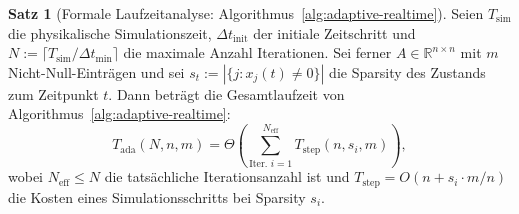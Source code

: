 \documentclass[a4paper,12pt]{report}
\theoremstyle{definition}
\newtheorem{satz}{Satz}
\begin{document}
	\begin{satz}[Formale Laufzeitanalyse: Algorithmus~\ref{alg:adaptive-realtime}]
		\label{satz:laufzeit-adaptive-realtime}
		Seien $T_{\mathrm{sim}}$ die physikalische Simulationszeit, $\Delta t_{\mathrm{init}}$ der initiale Zeitschritt und $N := \lceil T_{\mathrm{sim}} / \Delta t_{\mathrm{min}} \rceil$ die maximale Anzahl Iterationen. Sei ferner $A \in \mathbb{R}^{n \times n}$ mit $m$ Nicht-Null-Einträgen und sei $s_t := |\{j : x_j(t) \neq 0\}|$ die Sparsity des Zustands zum Zeitpunkt $t$. Dann beträgt die Gesamtlaufzeit von Algorithmus~\ref{alg:adaptive-realtime}:
		\[
			T_{\mathrm{ada}}(N, n, m) = \Theta\!\left(\sum_{\text{Iter. } i=1}^{N_{\mathrm{eff}}} T_{\mathrm{step}}(n, s_i, m)\right),
		\]
		wobei $N_{\mathrm{eff}} \leq N$ die tatsächliche Iterationsanzahl ist und $T_{\mathrm{step}} = O(n + s_i \cdot m/n)$ die Kosten eines Simulationsschritts bei Sparsity $s_i$.
	\end{satz}
\end{document}
